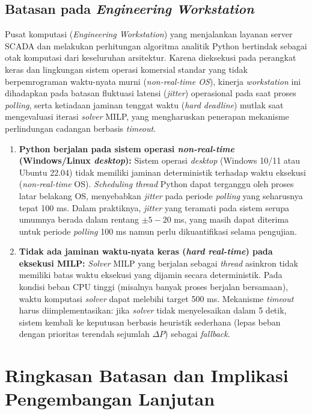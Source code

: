 \subsection{Batasan pada \textit{Engineering Workstation}}
\label{subsec:Batasan_pada_Engineering_Workstation}

Pusat komputasi (\textit{Engineering Workstation}) yang menjalankan layanan server SCADA dan melakukan perhitungan algoritma analitik Python bertindak sebagai otak komputasi dari keseluruhan arsitektur. Karena dieksekusi pada perangkat keras dan lingkungan sistem operasi komersial standar yang tidak berpemrograman waktu-nyata murni (\textit{non-real-time OS}), kinerja \textit{workstation} ini dihadapkan pada batasan fluktuasi latensi (\textit{jitter}) operasional pada saat proses \textit{polling}, serta ketiadaan jaminan tenggat waktu (\textit{hard deadline}) mutlak saat mengevaluasi iterasi \textit{solver} MILP, yang mengharuskan penerapan mekanisme perlindungan cadangan berbasis \textit{timeout}.

\begin{enumerate}
    \item[a.] \textbf{Python berjalan pada sistem operasi \textit{non-real-time} (Windows/Linux \textit{desktop}):} Sistem operasi \textit{desktop} (Windows 10/11 atau Ubuntu 22.04) tidak memiliki jaminan deterministik terhadap waktu eksekusi (\textit{non-real-time} OS). \textit{Scheduling thread} Python dapat terganggu oleh proses latar belakang OS, menyebabkan \textit{jitter} pada periode \textit{polling} yang seharusnya tepat 100 ms. Dalam praktiknya, \textit{jitter} yang teramati pada sistem serupa umumnya berada dalam rentang $\pm 5-20$ ms, yang masih dapat diterima untuk periode \textit{polling} 100 ms namun perlu dikuantifikasi selama pengujian.
    \item[b.] \textbf{Tidak ada jaminan waktu-nyata keras (\textit{hard real-time}) pada eksekusi MILP:} \textit{Solver} MILP yang berjalan sebagai \textit{thread} asinkron tidak memiliki batas waktu eksekusi yang dijamin secara deterministik. Pada kondisi beban CPU tinggi (misalnya banyak proses berjalan bersamaan), waktu komputasi \textit{solver} dapat melebihi target 500 ms. Mekanisme \textit{timeout} harus diimplementasikan: jika \textit{solver} tidak menyelesaikan dalam 5 detik, sistem kembali ke keputusan berbasis heuristik sederhana (lepas beban dengan prioritas terendah sejumlah $\Delta P$) sebagai \textit{fallback}.
\end{enumerate}

\section{Ringkasan Batasan dan Implikasi Pengembangan Lanjutan}
\label{sec:Ringkasan_Batasan_dan_Implikasi}

